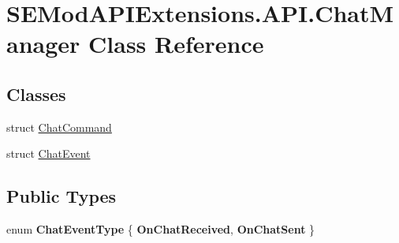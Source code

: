 \hypertarget{class_s_e_mod_a_p_i_extensions_1_1_a_p_i_1_1_chat_manager}{}\section{S\+E\+Mod\+A\+P\+I\+Extensions.\+A\+P\+I.\+Chat\+Manager Class Reference}
\label{class_s_e_mod_a_p_i_extensions_1_1_a_p_i_1_1_chat_manager}
\subsection*{Classes}
\begin{DoxyCompactItemize}
\item 
struct \hyperlink{struct_s_e_mod_a_p_i_extensions_1_1_a_p_i_1_1_chat_manager_1_1_chat_command}{Chat\+Command}
\item 
struct \hyperlink{struct_s_e_mod_a_p_i_extensions_1_1_a_p_i_1_1_chat_manager_1_1_chat_event}{Chat\+Event}
\end{DoxyCompactItemize}
\subsection*{Public Types}
\begin{DoxyCompactItemize}
\item 
\hypertarget{class_s_e_mod_a_p_i_extensions_1_1_a_p_i_1_1_chat_manager_a43f27d287f9ad4c54baf0c8a95f9a971}{}enum {\bfseries Chat\+Event\+Type} \{ {\bfseries On\+Chat\+Received}, 
{\bfseries On\+Chat\+Sent}
 \}\label{class_s_e_mod_a_p_i_extensions_1_1_a_p_i_1_1_chat_manager_a43f27d287f9ad4c54baf0c8a95f9a971}

\end{DoxyCompactItemize}
